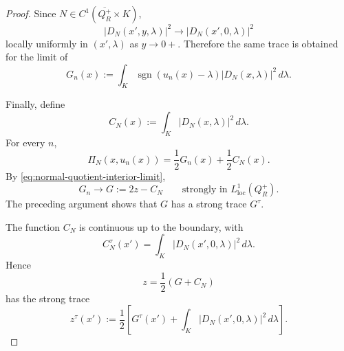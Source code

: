 \documentclass[10pt,a4paper]{amsart}
\begin{document}
\begin{proof}
Since \(N\in C^1(\overline{Q_R^+}\times K)\),
\[
    |D_N(x',y,\lambda)|^2
    \longrightarrow
    |D_N(x',0,\lambda)|^2
\]
locally uniformly in \((x',\lambda)\) as \(y\to0+\).  Therefore the same
trace is obtained for the limit of
\[
    G_n(x)
    :=
    \int_K
        \operatorname{sgn}(u_n(x)-\lambda)
        |D_N(x,\lambda)|^2\,d\lambda.
\]

Finally, define
\[
    C_N(x)
    :=
    \int_K
        |D_N(x,\lambda)|^2\,d\lambda.
\]
For every \(n\),
\begin{equation}
\label{eq:normal-quotient-average-trace-identity}
    \Pi_N(x,u_n(x))
    =
    \frac12G_n(x)
    +
    \frac12C_N(x).
\end{equation}
By \eqref{eq:normal-quotient-interior-limit},
\[
    G_n
    \longrightarrow
    G:=2z-C_N
    \qquad
    \text{strongly in }L^1_{\mathrm{loc}}(Q_R^+).
\]
The preceding argument shows that \(G\) has a strong trace \(G^\tau\).

The function \(C_N\) is continuous up to the boundary, with
\[
    C_N^\tau(x')
    =
    \int_K
        |D_N(x',0,\lambda)|^2\,d\lambda.
\]
Hence
\[
    z
    =
    \frac12(G+C_N)
\]
has the strong trace
\begin{equation}
\label{eq:normal-quotient-trace-formula}
    z^\tau(x')
    :=
    \frac12
    \left[
        G^\tau(x')
        +
        \int_K
            |D_N(x',0,\lambda)|^2\,d\lambda
    \right].
\end{equation}
\end{proof}
\end{document}
